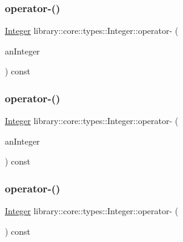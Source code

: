 \subsubsection{\texorpdfstring{operator-\/()}{operator-()}\hspace{0.1cm}{\footnotesize\ttfamily [1/3]}}
{\footnotesize\ttfamily \hyperlink{classlibrary_1_1core_1_1types_1_1_integer}{Integer} library\+::core\+::types\+::\+Integer\+::operator-\/ (\begin{DoxyParamCaption}\item[{const \hyperlink{classlibrary_1_1core_1_1types_1_1_integer}{Integer} \&}]{an\+Integer }\end{DoxyParamCaption}) const}

\mbox{\label{classlibrary_1_1core_1_1types_1_1_integer_a7bbe7f9e02df0f4d64df023552c109e2}} 
\subsubsection{\texorpdfstring{operator-\/()}{operator-()}\hspace{0.1cm}{\footnotesize\ttfamily [2/3]}}
{\footnotesize\ttfamily \hyperlink{classlibrary_1_1core_1_1types_1_1_integer}{Integer} library\+::core\+::types\+::\+Integer\+::operator-\/ (\begin{DoxyParamCaption}\item[{const \hyperlink{classlibrary_1_1core_1_1types_1_1_integer_a623afb1580f870fd8a1997b1c12c917d}{Integer\+::\+Value\+Type} \&}]{an\+Integer }\end{DoxyParamCaption}) const}

\mbox{\label{classlibrary_1_1core_1_1types_1_1_integer_ad9670b50ae46bc0f09e4995e445dab99}} 
\subsubsection{\texorpdfstring{operator-\/()}{operator-()}\hspace{0.1cm}{\footnotesize\ttfamily [3/3]}}
{\footnotesize\ttfamily \hyperlink{classlibrary_1_1core_1_1types_1_1_integer}{Integer} library\+::core\+::types\+::\+Integer\+::operator-\/ (\begin{DoxyParamCaption}{ }\end{DoxyParamCaption}) const}

